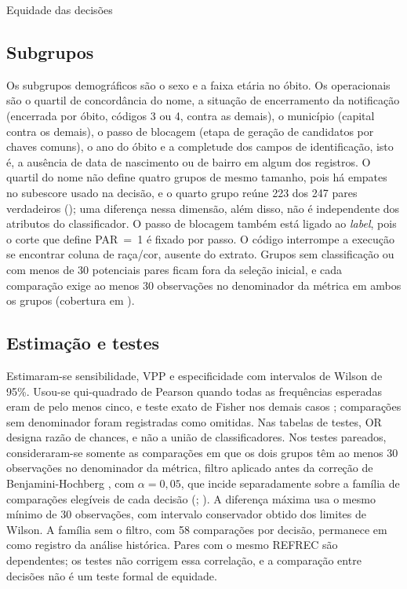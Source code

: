\begin{chapter}{Equidade das decisões}
\subsection{Subgrupos}\label{sec:e5-metodo-subgrupos}

Os subgrupos demográficos são o sexo e a faixa etária no óbito. Os operacionais são o quartil de concordância do nome, a situação de encerramento da notificação (encerrada por óbito, códigos 3 ou 4, contra as demais), o município (capital contra os demais), o passo de blocagem (etapa de geração de candidatos por chaves comuns), o ano do óbito e a completude dos campos de identificação, isto é, a ausência de data de nascimento ou de bairro em algum dos registros. O quartil do nome não define quatro grupos de mesmo tamanho, pois há empates no subescore usado na decisão, e o quarto grupo reúne 223 dos 247 pares verdadeiros (); uma diferença nessa dimensão, além disso, não é independente dos atributos do classificador. O passo de blocagem também está ligado ao \textit{label}, pois o corte que define PAR~=~1 é fixado por passo. O código interrompe a execução se encontrar coluna de raça/cor, ausente do extrato. Grupos sem classificação ou com menos de 30 potenciais pares ficam fora da seleção inicial, e cada comparação exige ao menos 30 observações no denominador da métrica em ambos os grupos (cobertura em ).

\subsection{Estimação e testes}\label{sec:e5-metodo-testes}

Estimaram-se sensibilidade, VPP e especificidade com intervalos de Wilson de 95\%. Usou-se qui-quadrado de Pearson quando todas as frequências esperadas eram de pelo menos cinco, e teste exato de Fisher nos demais casos \cite{Agresti2007}; comparações sem denominador foram registradas como omitidas. Nas tabelas de testes, OR designa razão de chances, e não a união de classificadores. Nos testes pareados, consideraram-se somente as comparações em que os dois grupos têm ao menos 30 observações no denominador da métrica, filtro aplicado antes da correção de Benjamini-Hochberg \cite{Benjamini1995fdr}, com $\alpha=0{,}05$, que incide separadamente sobre a família de comparações elegíveis de cada decisão (; ). A diferença máxima usa o mesmo mínimo de 30 observações, com intervalo conservador obtido dos limites de Wilson. A família sem o filtro, com 58 comparações por decisão, permanece em  como registro da análise histórica. Pares com o mesmo REFREC são dependentes; os testes não corrigem essa correlação, e a comparação entre decisões não é um teste formal de equidade.


\end{chapter}
